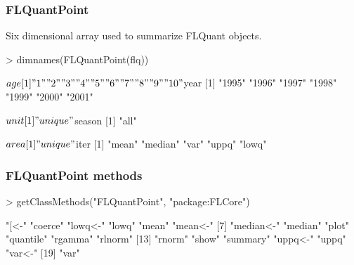 \documentclass{beamer}%
\begin{document}
\begin{frame}[containsverbatim]
  \frametitle{FLQuantPoint}

Six dimensional array used to summarize FLQuant objects.\newline

{\tiny{
\begin{Schunk}
\begin{Sinput}
> dimnames(FLQuantPoint(flq))
\end{Sinput}
\begin{Soutput}
$age
 [1] "1"  "2"  "3"  "4"  "5"  "6"  "7"  "8"  "9"  "10"

$year
[1] "1995" "1996" "1997" "1998" "1999" "2000" "2001"

$unit
[1] "unique"

$season
[1] "all"

$area
[1] "unique"

$iter
[1] "mean"   "median" "var"    "uppq"   "lowq"  
\end{Soutput}
\end{Schunk}
}}

\end{frame}

\begin{frame}[containsverbatim]
  \frametitle{FLQuantPoint methods}

{\tiny{
\begin{Schunk}
\begin{Sinput}
> getClassMethods("FLQuantPoint", "package:FLCore")
\end{Sinput}
\begin{Soutput}
 [1] "[<-"      "coerce"   "lowq<-"   "lowq"     "mean"     "mean<-"  
 [7] "median<-" "median"   "plot"     "quantile" "rgamma"   "rlnorm"  
[13] "rnorm"    "show"     "summary"  "uppq<-"   "uppq"     "var<-"   
[19] "var"     
\end{Soutput}
\end{Schunk}
}}

\end{frame}
\end{document}
